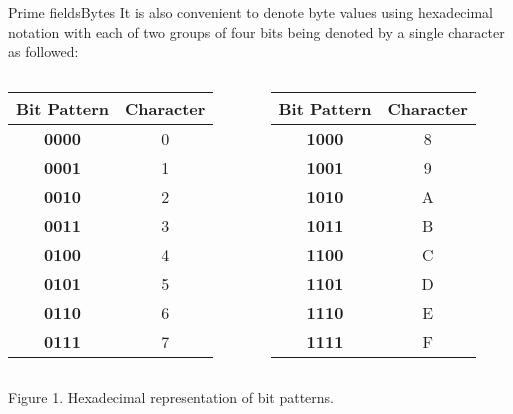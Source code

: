 \begin{frame}[t]{Prime fields}{Bytes}
	It is also convenient to denote byte values using hexadecimal notation with each of two groups of four bits being denoted by a single character as followed: \\[5pt]

	\begin{columns}
		\tiny 
		\setlength{\tabcolsep}{3pt} 
		\begin{column}{0.5\textwidth}		
			\begin{table}[]
				\begin{tabular}{c|c}
					\textbf{Bit Pattern} & \textbf{Character} \\ \hline
					\textbf{0000} & 0                  \\
					\textbf{0001} & 1                  \\
					\textbf{0010} & 2                  \\
					\textbf{0011} & 3                  \\
					\textbf{0100} & 4                  \\
					\textbf{0101} & 5                  \\
					\textbf{0110} & 6                  \\
					\textbf{0111} & 7                  \\					
				\end{tabular}
			\end{table}
		\end{column}

		
		\begin{column}{0.5\textwidth}  %
			\begin{table}[]
				\begin{tabular}{c|c}
					\textbf{Bit Pattern} & \textbf{Character} \\ \hline
					\textbf{1000} & 8                  \\
					\textbf{1001} & 9                  \\
					\textbf{1010} & A                  \\
					\textbf{1011} & B                  \\	
					\textbf{1100} & C                  \\
					\textbf{1101} & D                  \\
					\textbf{1110} & E                  \\
					\textbf{1111} & F                  \\
					
				\end{tabular}
			\end{table}
		\end{column}
	\end{columns}

	\centering Figure 1. Hexadecimal representation of bit patterns.	
\end{frame}


